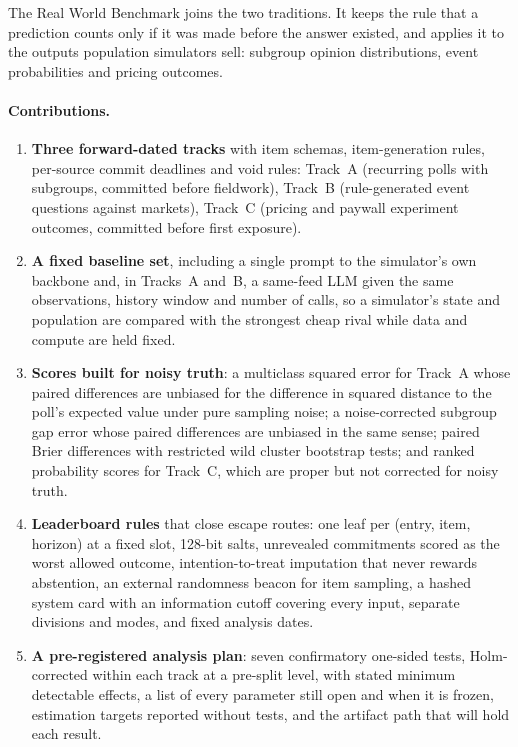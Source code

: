 \documentclass[11pt]{article}
\begin{document}
The Real World Benchmark joins the two traditions. It keeps the rule that a prediction counts only if it was made before the answer existed, and applies it to the outputs population simulators sell: subgroup opinion distributions, event probabilities and pricing outcomes.

\paragraph{Contributions.}
\begin{enumerate}
  \item \textbf{Three forward-dated tracks} with item schemas, item-generation rules, per-source commit deadlines and void rules: Track~A (recurring polls with subgroups, committed before fieldwork), Track~B (rule-generated event questions against markets), Track~C (pricing and paywall experiment outcomes, committed before first exposure).
  \item \textbf{A fixed baseline set}, including a single prompt to the simulator's own backbone and, in Tracks~A and~B, a same-feed LLM given the same observations, history window and number of calls, so a simulator's state and population are compared with the strongest cheap rival while data and compute are held fixed.
  \item \textbf{Scores built for noisy truth}: a multiclass squared error for Track~A whose paired differences are unbiased for the difference in squared distance to the poll's expected value under pure sampling noise; a noise-corrected subgroup gap error whose paired differences are unbiased in the same sense; paired Brier differences with restricted wild cluster bootstrap tests; and ranked probability scores for Track~C, which are proper but not corrected for noisy truth.
  \item \textbf{Leaderboard rules} that close escape routes: one leaf per (entry, item, horizon) at a fixed slot, 128-bit salts, unrevealed commitments scored as the worst allowed outcome, intention-to-treat imputation that never rewards abstention, an external randomness beacon for item sampling, a hashed system card with an information cutoff covering every input, separate divisions and modes, and fixed analysis dates.
  \item \textbf{A pre-registered analysis plan}: seven confirmatory one-sided tests, Holm-corrected within each track at a pre-split level, with stated minimum detectable effects, a list of every parameter still open and when it is frozen, estimation targets reported without tests, and the artifact path that will hold each result.
\end{enumerate}
\end{document}
